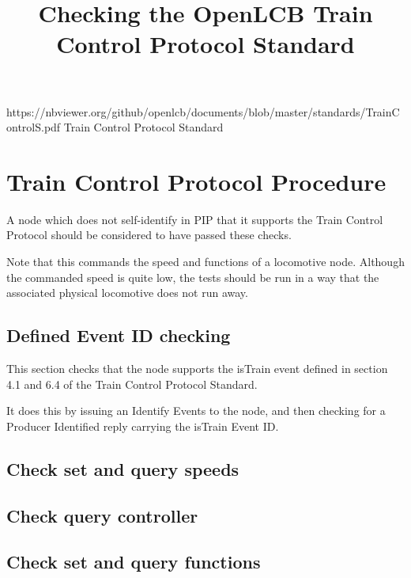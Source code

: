 

\title{Checking the OpenLCB Train Control Protocol Standard}


\maketitle


\introductionCaveats
    {https://nbviewer.org/github/openlcb/documents/blob/master/standards/TrainControlS.pdf}
    {Train Control Protocol Standard}

\section{Train Control Protocol Procedure}


A node which does not self-identify in PIP that it supports
the Train Control Protocol should be considered to have passed these checks.
\pipsetFootnote

Note that this commands the speed and functions of a locomotive node.
Although the commanded speed is quite low, the
tests should be run in a way that the associated physical locomotive
does not run away.

\subsection{Defined Event ID checking}

This section checks that the node supports the isTrain event
defined in section 4.1 and 6.4 of the Train Control Protocol Standard.

It does this by issuing an Identify Events to the node, and then
checking for a Producer Identified reply carrying the isTrain Event ID.

\subsection{Check set and query speeds}

\subsection{Check query controller}

\subsection{Check set and query functions}

